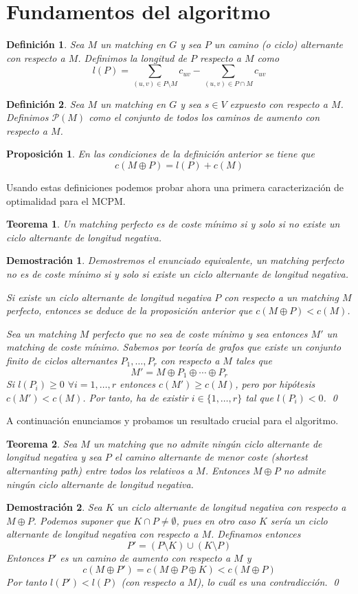 \documentclass[twoside,a4paper,openright,12pt]{book}
\newtheorem{defi}{Definici\'on}[section]
\newtheorem{prop}{Proposici\'on}[section]
\newtheorem{thm}{Teorema}[section]
\newtheorem*{dem}{Demostración}
\begin{document}
\section{Fundamentos del algoritmo}
\begin{defi}
Sea $M$ un matching en $G$ y sea $P$ un camino (o ciclo) alternante con respecto a $M$. Definimos la longitud de $P$ respecto a $M$ como
$$
l(P) = \sum_{(u,v)\in P\setminus M}c_{uv} - \sum_{(u,v)\in P\cap M}c_{uv}
$$
\end{defi}
\begin{defi}
Sea $M$ un matching en $G$ y sea $s\in V$ expuesto con respecto a $M$. Definimos $\mathcal{P}(M)$ como el conjunto de todos los caminos de aumento con respecto a $M$.
\end{defi}
\begin{prop}
En las condiciones de la definición anterior se tiene que
$$
c(M\oplus P) = l(P) + c(M)
$$
\end{prop}

Usando estas definiciones podemos probar ahora una primera caracterización de optimalidad para el MCPM.
\begin{thm}
Un matching perfecto es de coste mínimo si y solo si no existe un ciclo alternante de longitud negativa.
\end{thm}
\begin{dem}
Demostremos el enunciado equivalente, un matching perfecto no es de coste mínimo si y solo si existe un ciclo alternante de longitud negativa.

Si existe un ciclo alternante de longitud negativa $P$ con respecto a un matching $M$ perfecto, entonces se deduce de la proposición anterior que $c(M\oplus P) < c(M)$. 

Sea un matching $M$ perfecto que no sea de coste mínimo y sea entonces $M'$ un matching de coste mínimo. Sabemos por teoría de grafos que existe un conjunto finito de ciclos alternantes $P_1,\dotsc,P_r$ con respecto a $M$ tales que
$$
M' = M \oplus P_1 \oplus \cdots \oplus P_r
$$
Si $l(P_i) \geq 0$ $\forall i=1,\dotsc, r$ entonces $c(M') \geq c(M)$, pero por hipótesis $c(M')<c(M)$. Por tanto, ha de existir $i \in \{1,\dotsc,r\}$ tal que $l(P_i)<0$. \qed
\end{dem}
A continuación enunciamos y probamos un resultado crucial para el algoritmo.
\begin{thm}
Sea $M$ un matching que no admite ningún ciclo alternante de longitud negativa y sea $P$ el camino alternante de menor coste (\textit{shortest alternanting path}) entre todos los relativos a $M$. Entonces $M\oplus P$ no admite ningún ciclo alternante de longitud negativa.
\end{thm}
\begin{dem}
Sea $K$ un ciclo alternante de longitud negativa con respecto a $M\oplus P$. Podemos suponer que $K\cap P \neq \emptyset$, pues en otro caso $K$ sería un ciclo alternante de longitud negativa con respecto a $M$. Definamos entonces
$$
P' = (P\setminus K)\cup (K\setminus P)
$$
Entonces $P'$ es un camino de aumento con respecto a $M$ y
$$
c(M \oplus P') = c(M \oplus P \oplus K) < c(M \oplus P)
$$
Por tanto $l(P')<l(P)$ (con respecto a $M$), lo cuál es una contradicción.
\qed
\end{dem}
\end{document}

